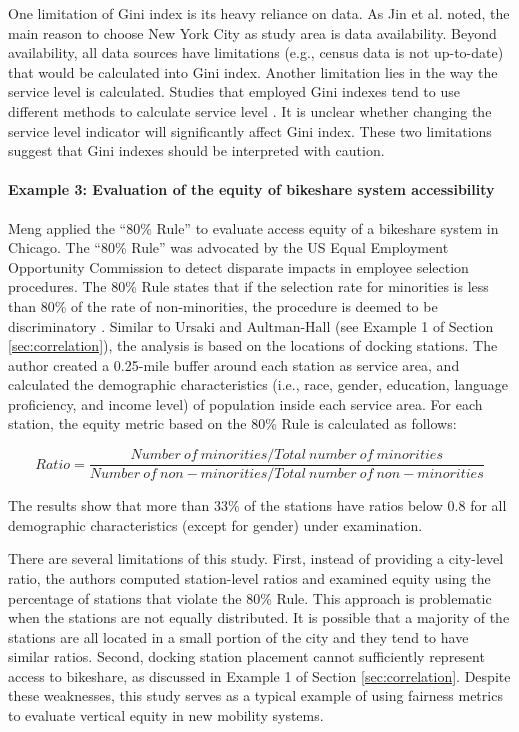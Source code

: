\documentclass[11pt]{article}
\begin{document}
One limitation of Gini index is its heavy reliance on data. As Jin et al. noted, the main reason to choose New York City as study area is data availability. Beyond availability, all data sources have limitations (e.g., census data is not up-to-date) that would be calculated into Gini index. Another limitation lies in the way the service level is calculated. Studies that employed Gini indexes tend to use different methods to calculate service level \cite{feng2014trade}. It is unclear whether changing the service level indicator will significantly affect Gini index. These two limitations suggest that Gini indexes should be interpreted with caution. 

\paragraph{Example 3: Evaluation of the equity of bikeshare system accessibility}
Meng \cite{meng2018evaluation} applied the “80\% Rule” to evaluate access equity of a bikeshare system in Chicago. The “80\% Rule” was advocated by the US Equal Employment Opportunity Commission to detect disparate impacts in employee selection procedures. The 80\% Rule states that if the selection rate for minorities is less than 80\% of the rate of non-minorities, the procedure is deemed to be discriminatory \cite{useeoc}. Similar to Ursaki and Aultman-Hall (see Example 1 of Section \ref{sec:correlation}), the analysis is based on the locations of docking stations. The author created a 0.25-mile buffer around each station as service area, and calculated the demographic characteristics (i.e., race, gender, education, language proficiency, and income level) of population inside each service area. For each station, the equity metric based on the 80\% Rule is calculated as follows:


\begin{equation}
    Ratio = \frac{Number \  of \  minorities / Total \ number \ of \ minorities}{Number \ of \ non-minorities / Total \ number \ of \ non-minorities}
\end{equation}

The results show that more than 33\% of the stations have ratios below 0.8 for all demographic characteristics (except for gender) under examination.

There are several limitations of this study. First, instead of providing a city-level ratio, the authors computed station-level ratios and examined equity using the percentage of stations that violate the 80\% Rule. This approach is problematic when the stations are not equally distributed. It is possible that a majority of the stations are all located in a small portion of the city and they tend to have similar ratios. Second, docking station placement cannot sufficiently represent access to bikeshare, as discussed in Example 1 of Section \ref{sec:correlation}. Despite these weaknesses, this study serves as a typical example of using fairness metrics to evaluate vertical equity in new mobility systems. 
\end{document}
